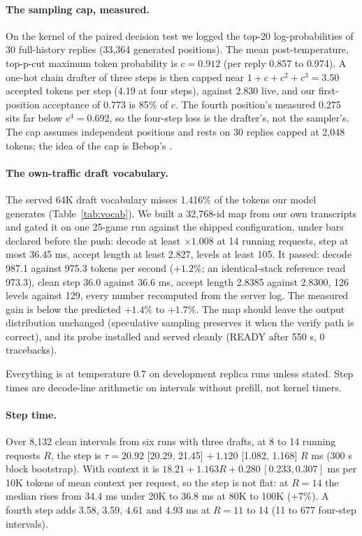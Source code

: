 \paragraph{The sampling cap, measured.}
On the kernel of the paired decision test we logged the top-20 log-probabilities of 30 full-history replies (33,364 generated positions). %
The mean post-temperature, top-p-cut maximum token probability is $c = 0.912$ (per reply 0.857 to 0.974). %
A one-hot chain drafter of three steps is then capped near $1 + c + c^2 + c^3 = 3.50$ accepted tokens per step (4.19 at four steps), against 2.830 live, and our first-position acceptance of 0.773 is 85\% of $c$. %
The fourth position's measured 0.275 sits far below $c^4 = 0.692$, so the four-step loss is the drafter's, not the sampler's. %
The cap assumes independent positions and rests on 30 replies capped at 2,048 tokens; the idea of the cap is Bebop's \citep{li2026bebop}. %

\paragraph{The own-traffic draft vocabulary.}
The served 64K draft vocabulary misses 1.416\% of the tokens our model generates (Table~\ref{tab:vocab}). %
We built a 32,768-id map from our own transcripts and gated it on one 25-game run against the shipped configuration, under bars declared before the push: decode at least $\times1.008$ at 14 running requests, step at most 36.45 ms, accept length at least 2.827, levels at least 105. %
It passed: decode 987.1 against 975.3 tokens per second ($+1.2\%$; an identical-stack reference read 973.3), clean step 36.0 against 36.6 ms, accept length 2.8385 against 2.8300, 126 levels against 129, every number recomputed from the server log. %
The measured gain is below the predicted $+1.4\%$ to $+1.7\%$. %
The map should leave the output distribution unchanged (speculative sampling preserves it when the verify path is correct), and its probe installed and served cleanly (READY after 550 s, 0 tracebacks). %


Everything is at temperature 0.7 on development replica runs unless stated. Step times are decode-line arithmetic on intervals without prefill, not kernel timers. %

\paragraph{Step time.}
Over 8,132 clean intervals from six runs with three drafts, at 8 to 14 running requests $R$, the step is $\tau=20.92$ [20.29, 21.45] $+\,1.120$ [1.082, 1.168] $R$ ms (300 s block bootstrap). %
With context it is $18.21+1.163R+0.280\,[0.233,0.307]$ ms per 10K tokens of mean context per request, so the step is not flat: at $R=14$ the median rises from 34.4 ms under 20K to 36.8 ms at 80K to 100K (+7\%). %
A fourth step adds 3.58, 3.59, 4.61 and 4.93 ms at $R=11$ to 14 (11 to 677 four-step intervals). %

